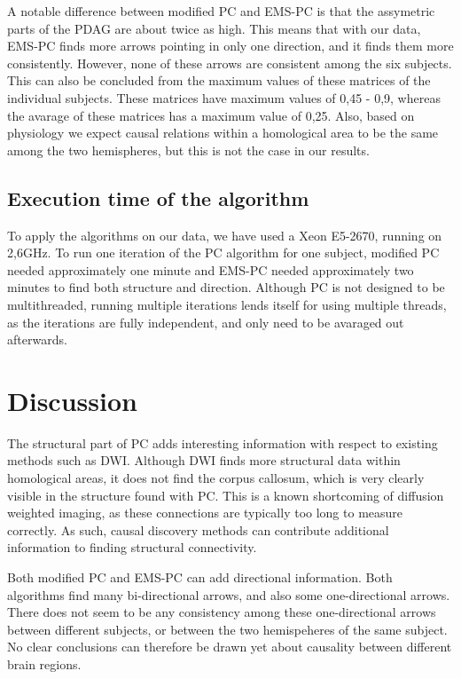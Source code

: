 \documentclass[a4paper, 10pt, english, onecolumn]{article}
\begin{document}
A notable difference between modified PC and EMS-PC is that the assymetric parts of the PDAG are about twice as high. %
This means that with our data, EMS-PC finds more arrows pointing in only one direction, and it finds them more consistently.
However, none of these arrows are consistent among the six subjects.
This can also be concluded from the maximum values of these matrices of the individual subjects.
These matrices have maximum values of 0,45 - 0,9, whereas the avarage of these matrices has a maximum value of 0,25.
Also, based on physiology we expect causal relations within a homological area to be the same among the two hemispheres, but this is not the case in our results.

\subsection{Execution time of the algorithm}
To apply the algorithms on our data, we have used a Xeon E5-2670, running on 2,6GHz.
To run one iteration of the PC algorithm for one subject, modified PC needed approximately one minute and EMS-PC needed approximately two minutes to find both structure and direction.
Although PC is not designed to be multithreaded, running multiple iterations lends itself for using multiple threads, as the iterations are fully independent, and only need to be avaraged out afterwards.


\section{Discussion}

The structural part of PC adds interesting information with respect to existing methods such as DWI.
Although DWI finds more structural data within homological areas, it does not find the corpus callosum, which is very clearly visible in the structure found with PC.
This is a known shortcoming of diffusion weighted imaging, as these connections are typically too long to measure correctly.
As such, causal discovery methods can contribute additional information to finding structural connectivity.

Both modified PC and EMS-PC can add directional information.
Both algorithms find many bi-directional arrows, and also some one-directional arrows.
There does not seem to be any consistency among these one-directional arrows  between different subjects, or between the two hemispeheres of the same subject.
No clear conclusions can therefore be drawn yet about causality between different brain regions.
\end{document}
